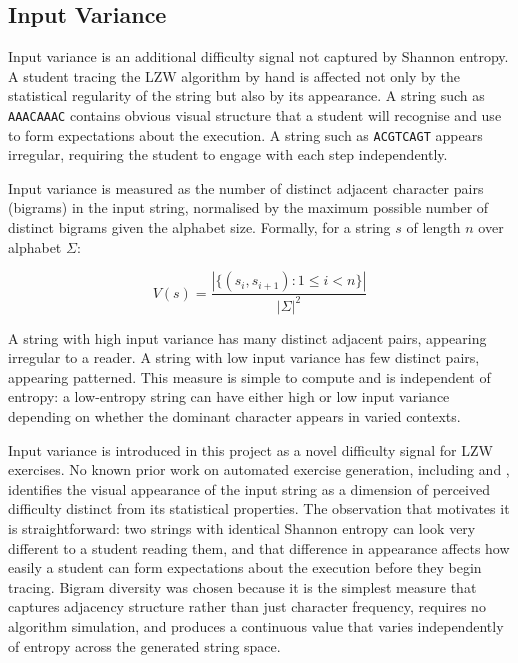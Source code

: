 \documentclass{l4proj}
\begin{document}
\subsection{Input Variance}

Input variance is an additional difficulty signal not captured by Shannon entropy. A student tracing the LZW algorithm by hand is affected not only by the statistical regularity of the string but also by its appearance. A string such as \texttt{AAACAAAC} contains obvious visual structure that a student will recognise and use to form expectations about the execution. A string such as \texttt{ACGTCAGT} appears irregular, requiring the student to engage with each step independently.

Input variance is measured as the number of distinct adjacent character pairs (bigrams) in the input string, normalised by the maximum possible number of distinct bigrams given the alphabet size. Formally, for a string $s$ of length $n$ over alphabet $\Sigma$:

\begin{equation}
    V(s) = \frac{|\{(s_i, s_{i+1}) : 1 \leq i < n\}|}{|\Sigma|^2}
\end{equation}

A string with high input variance has many distinct adjacent pairs, appearing irregular to a reader. A string with low input variance has few distinct pairs, appearing patterned. This measure is simple to compute and is independent of entropy: a low-entropy string can have either high or low input variance depending on whether the dominant character appears in varied contexts.

Input variance is introduced in this project as a novel difficulty signal for LZW exercises. No known prior work on automated exercise generation, including \citet{Hoz21} and \citet{PriorGlasgow}, identifies the visual appearance of the input string as a dimension of perceived difficulty distinct from its statistical properties. The observation that motivates it is straightforward: two strings with identical Shannon entropy can look very different to a student reading them, and that difference in appearance affects how easily a student can form expectations about the execution before they begin tracing. Bigram diversity was chosen because it is the simplest measure that captures adjacency structure rather than just character frequency, requires no algorithm simulation, and produces a continuous value that varies independently of entropy across the generated string space.
\end{document}
